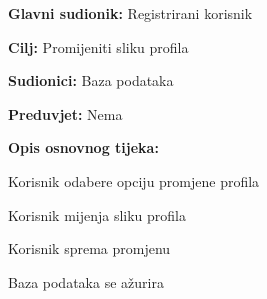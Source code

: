 				
					\noindent {}
					\begin{packed_item}
						
						\item \textbf{Glavni sudionik: } Registrirani korisnik
						\item  \textbf{Cilj:} Promijeniti sliku profila
						\item  \textbf{Sudionici:} Baza podataka
						\item  \textbf{Preduvjet:} Nema
						\item  \textbf{Opis osnovnog tijeka:}
						
						\item[] \begin{packed_enum}
							
							\item Korisnik odabere opciju promjene profila
							\item Korisnik mijenja sliku profila
							\item Korisnik sprema promjenu
							\item Baza podataka se ažurira
						\end{packed_enum}
						
					\end{packed_item}
					
